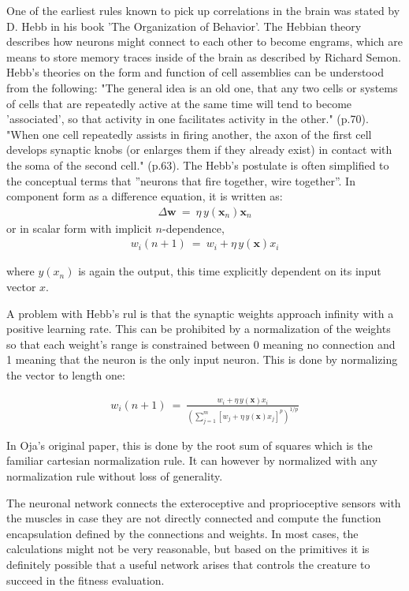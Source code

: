 \documentclass[letterpaper, 10 pt, conference]{ieeeconf}  %
\begin{document}
One of the earliest rules known to pick up correlations in the brain was stated by D. Hebb in his book 'The Organization of Behavior'. The Hebbian theory describes how neurons might connect to each other to become engrams, which are means to store memory traces inside of the brain as described by Richard Semon. Hebb's theories on the form and function of cell assemblies can be understood from the following: "The general idea is an old one, that any two cells or systems of cells that are repeatedly active at the same time will tend to become 'associated', so that activity in one facilitates activity in the other." \cite{Hebb1949}(p.70). "When one cell repeatedly assists in firing another, the axon of the first cell develops synaptic knobs (or enlarges them if they already exist) in contact with the soma of the second cell." \cite{Hebb1949}(p.63). The Hebb's postulate is often simplified to the conceptual terms that ''neurons that fire together, wire together''. In component form as a difference equation, it is written as:
\begin{align*}
\Delta\mathbf{w} ~ = ~ \eta\, y(\mathbf{x}_n) \mathbf{x}_{n}
\end{align*}
or in scalar form with implicit  $n$-dependence,
\begin{align*}
w_{i}(n+1) ~ = ~ w_{i} + \eta\, y(\mathbf{x}) x_{i}
\end{align*}

where $y(x_n)$ is again the output, this time explicitly dependent on its input vector $x$.

A problem with Hebb's rul is that the synaptic weights approach infinity with a positive learning rate. This can be prohibited by a normalization of the weights so that each weight's range is constrained between 0 meaning no connection and 1 meaning that the neuron is the only input neuron. This is done by normalizing the vector to length one:

\begin{align*}
w_i (n+1) ~ = ~ \frac{w_i + \eta\, y(\mathbf{x}) x_i}{\left(\sum_{j=1}^m [w_j + \eta\, y(\mathbf{x}) x_j]^p \right)^{1/p}}
\end{align*}

In Oja's original paper\cite{Oja1982}, this is done by the root sum of squares which is the familiar cartesian normalization rule. It can however by normalized with any normalization rule without loss of generality.

The neuronal network connects the exteroceptive and proprioceptive sensors with the muscles in case they are not directly connected and compute the function encapsulation defined by the connections and weights. In most cases, the calculations might not be very reasonable, but based on the primitives it is definitely possible that a useful network arises that controls the creature to succeed in the fitness evaluation.
\end{document}
